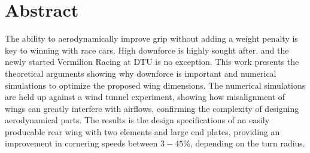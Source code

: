 \vspace{6cm}
\chapter*{Abstract}

The ability to aerodynamically improve grip without adding a weight penalty is key to winning with race cars. High downforce is highly sought after, and the newly started Vermilion Racing at DTU is no exception. This work presents the theoretical arguments showing why downforce is important and numerical simulations to optimize the proposed wing dimensions. The numerical simulations are held up against a wind tunnel experiment, showing how misalignment of wings can greatly interfere with airflows, confirming the complexity of designing aerodynamical parts. The results is the design specifications of an easily producable rear wing with two elements and large end plates, providing an improvement in cornering speeds between $3-45\%$, depending on the turn radius. 

